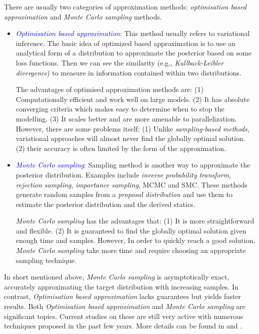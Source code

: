 There are usually two categories of approximation methods: \textit{optimisation based approximation} and \textit{Monte Carlo sampling} methods.
\begin{itemize}[left=0pt]
    \item \textcolor{blue}{\textit{Optimisation based approximation}}: This method usually refers to variational inference. The basic idea of optimized based approximation is to use an analytical form of a distribution to approximate the posterior based on some loss functions. Then we can see the similarity (e.g., \textit{Kullback-Leibler divergence}) to measure in information contained within two distributions.
    
    The advantages of optimised approximation methods are: (1) Computationally efficient and work well on large models. (2) It has absolute converging criteria which makes easy to determine when to stop the modelling. (3) It scales better and are more amenable to parallelization. However, there are some problems itself: (1) Unlike \textit{sampling-based methods}, variational approaches will almost never find the globally optimal solution. (2) their accuracy is often limited by the form of the approximation.
    \item \textcolor{blue}{\textit{Monte Carlo sampling}}: Sampling method is another way to approximate the posterior distribution. Examples include \textit{inverse probability transform}, \textit{rejection sampling}, \textit{importance sampling}, \acrfull{MCMC} and \acrfull{SMC}. These methods generate random samples from a \textit{proposal distribution} and use them to estimate the posterior distribution and the derived statics.

    \textit{Monte Carlo sampling} has the advantages that: (1) It is more straightforward and flexible. (2) It is guaranteed to find the globally optimal solution given enough time and samples. However, In order to quickly reach a good solution, \textit{Monte Carlo sampling} take more time and require choosing an appropriate sampling technique. 
\end{itemize}

In short mentioned above, \textit{Monte Carlo sampling} is asymptotically exact, accurately approximating the target distribution with increasing samples. In contrast, \textit{Optimisation based approximation} lacks guarantees but yields faster results. Both \textit{Optimisation based approximation} and \textit{Monte Carlo sampling} are significant topics. Current studies on these are still very active with numerous techniques proposed in the past few years. More details can be found in \cite{murphy2012} and \cite{blei2017}.

